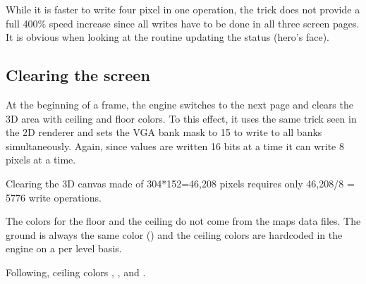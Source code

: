 While it is faster to write four pixel in one operation, the trick does not provide a full 400\% speed increase since all writes have to be done in all three screen pages. It is obvious when looking at the routine updating the status (hero's face).\\
\par
\begin{minipage}{\textwidth}

\end{minipage}



\subsection{Clearing the screen}
At the beginning of a frame, the engine switches to the next page and clears the 3D area with ceiling and floor colors. To this effect, it uses the same trick seen in the 2D renderer and sets the VGA bank mask to 15 to write to all banks simultaneously. Again, since values are written 16 bits at a time it can write 8 pixels at a time.\\ 
\par
\begin{minipage}{\textwidth}
 
 \end{minipage}
\par
Clearing the 3D canvas made of 304*152=46,208 pixels requires only 46,208/8 = 5776 write operations.\\
\par
The colors for the floor and the ceiling do not come from the maps data files. The ground is always the same color () and the ceiling colors are hardcoded in the engine on a per level basis.\\
\par
\begin{minipage}{\textwidth}
 
 \end{minipage}
\par


Following, ceiling colors , ,  and .\\ 
\par
{}






